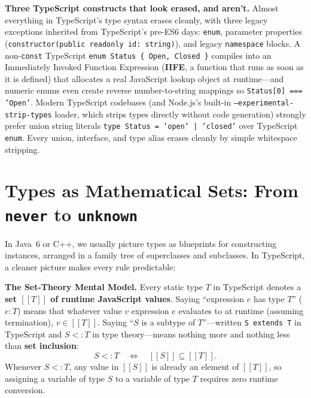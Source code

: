 \begin{trapbox}
\textbf{Three TypeScript constructs that look erased, and aren't.} Almost everything in TypeScript's type syntax erases cleanly, with three legacy exceptions inherited from TypeScript's pre-ES6 days: \texttt{enum}, parameter properties (\texttt{constructor(public readonly id: string)}), and legacy \texttt{namespace} blocks. A non-\texttt{const} TypeScript \texttt{enum Status \{ Open, Closed \}} compiles into an Immediately Invoked Function Expression (\textbf{IIFE}, a function that runs as soon as it is defined) that allocates a real JavaScript lookup object at runtime---and numeric enums even create reverse number-to-string mappings so \texttt{Status[0] === 'Open'}. Modern TypeScript codebases (and Node.js's built-in \texttt{--experimental-strip-types} loader, which strips types directly without code generation) strongly prefer union string literals \texttt{type Status = 'open' | 'closed'} over TypeScript \texttt{enum}. Every union, interface, and type alias erases cleanly by simple whitespace stripping.
\end{trapbox}

\section{Types as Mathematical Sets: From \texttt{never} to \texttt{unknown}}
\label{ch09:types-as-sets}

In Java~6 or C++, we usually picture types as blueprints for constructing instances, arranged in a family tree of superclasses and subclasses. In TypeScript, a cleaner picture makes every rule predictable:

\begin{focusbox}
\textbf{The Set-Theory Mental Model.} Every static type $T$ in TypeScript denotes a \textbf{set $[\![ T ]\!]$ of runtime JavaScript values}. Saying ``expression $e$ has type $T$'' ($e : T$) means that whatever value $v$ expression $e$ evaluates to at runtime (assuming termination), $v \in [\![ T ]\!]$. Saying ``$S$ is a subtype of $T$''---written \texttt{S extends T} in TypeScript and $S <: T$ in type theory---means nothing more and nothing less than \textbf{set inclusion}:
\[
  S <: T \quad\Longleftrightarrow\quad [\![ S ]\!] \subseteq [\![ T ]\!].
\]
Whenever $S <: T$, any value in $[\![ S ]\!]$ is already an element of $[\![ T ]\!]$, so assigning a variable of type $S$ to a variable of type $T$ requires zero runtime conversion.
\end{focusbox}

